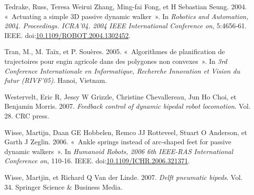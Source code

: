 \documentclass[french,A4paper,]{book}
\begin{document}
\hypertarget{ref-tedrake04}{}
Tedrake, Russ, Teresa Weirui Zhang, Ming-fai Fong, et H Sebastian Seung.
2004. «~Actuating a simple 3D passive dynamic walker~». In
\emph{Robotics and Automation, 2004. Proceedings. ICRA'04. 2004 IEEE
International Conference on}, 5:4656‑61. IEEE.
doi:\href{https://doi.org/10.1109/ROBOT.2004.1302452}{10.1109/ROBOT.2004.1302452}.

\hypertarget{ref-decoupage}{}
Tran, M., M. Taïx, et P. Souères. 2005. «~Algorithmes de planification
de trajectoires pour engin agricole dans des polygones non convexes~».
In \emph{3rd Conference Internationale en Informatique, Recherche
Innovation et Vision du futur (RIVF'05)}. Hanoi, Vietnam.

\hypertarget{ref-westervelt07}{}
Westervelt, Eric R, Jessy W Grizzle, Christine Chevallereau, Jun Ho
Choi, et Benjamin Morris. 2007. \emph{Feedback control of dynamic
bipedal robot locomotion}. Vol. 28. CRC press.

\hypertarget{ref-wisse06}{}
Wisse, Martijn, Daan GE Hobbelen, Remco JJ Rotteveel, Stuart O Anderson,
et Garth J Zeglin. 2006. «~Ankle springs instead of arc-shaped feet for
passive dynamic walkers~». In \emph{Humanoid Robots, 2006 6th IEEE-RAS
International Conference on}, 110‑16. IEEE.
doi:\href{https://doi.org/10.1109/ICHR.2006.321371}{10.1109/ICHR.2006.321371}.

\hypertarget{ref-wisse07}{}
Wisse, Martjin, et Richard Q Van der Linde. 2007. \emph{Delft pneumatic
bipeds}. Vol. 34. Springer Science \& Business Media.
\end{document}
